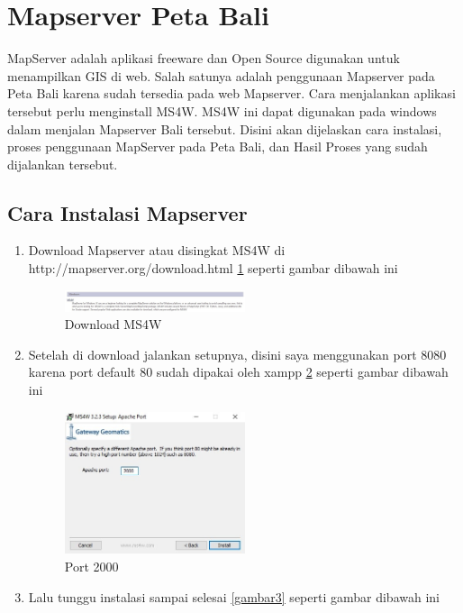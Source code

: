 \section{Mapserver Peta Bali}
MapServer  adalah aplikasi freeware dan Open Source digunakan untuk  menampilkan GIS di web. Salah satunya adalah penggunaan Mapserver pada Peta Bali karena sudah tersedia pada web Mapserver. Cara menjalankan aplikasi tersebut perlu menginstall MS4W. MS4W ini dapat digunakan pada windows dalam menjalan Mapserver Bali tersebut. Disini akan dijelaskan cara instalasi, proses penggunaan MapServer pada Peta Bali, dan Hasil Proses yang sudah dijalankan tersebut.
\subsection{Cara Instalasi Mapserver}
\begin{enumerate}
\item
Download Mapserver atau disingkat MS4W di http://mapserver.org/download.html \ref{gambar1} seperti gambar dibawah ini
\begin{figure}[ht]
	    \centerline{\includegraphics[width=0.50\textwidth]{figures/gambar1.JPG}}
	    \caption{Download MS4W}
		\label{gambar1}
		\end{figure}
\item
Setelah di download jalankan setupnya, disini saya menggunakan port 8080 karena port default 80 sudah dipakai oleh xampp \ref{gambar2} seperti gambar dibawah ini
\begin{figure}[ht]
	    \centerline{\includegraphics[width=0.50\textwidth]{figures/gambar2.JPG}}
	    \caption{Port 2000}
		\label{gambar2}
		\end{figure}
\item
Lalu tunggu instalasi sampai selesai \ref{gambar3} seperti gambar dibawah ini
\begin{figure}[ht]

\end{figure}
\end{enumerate}
